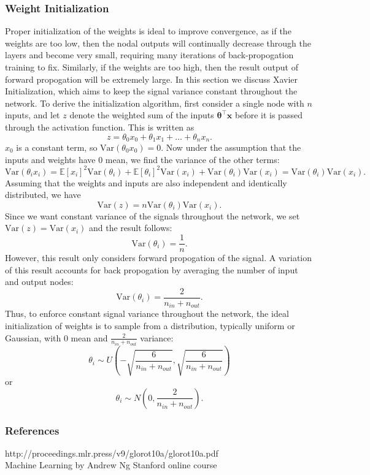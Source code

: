 \documentclass[a4paper,12pt]{article}
\newcommand{\E}{\mathbb{E}}
\newcommand{\Var}{\mathrm{Var}}
\numberwithin{equation}{section}
\begin{document}
\subsubsection{Weight Initialization}
Proper initialization of the weights is ideal to improve convergence, as if the weights are too low, then the nodal outputs will continually decrease through the layers and become very small, requiring many iterations of back-propogation training to fix. Similarly, if the weights are too high, then the result output of forward propogation will be extremely large. In this section we discuss Xavier Initialization, which aims to keep the signal variance constant throughout the network. To derive the initialization algorithm, first consider a single node with $n$ inputs, and let $z$ denote the weighted sum of the inputs $\bm{\theta}^\top\textbf{x}$ before it is passed through the activation function. This is written as
\[z=\theta_0x_0+\theta_1x_1+\dots+\theta_nx_n.\]
$x_0$ is a constant term, so $\Var(\theta_0x_0)=0$. Now under the assumption that the inputs and weights have 0 mean, we find the variance of the other terms:
\[\Var(\theta_ix_i)=\E[x_i]^2\Var(\theta_i)+\E[\theta_i]^2\Var(x_i)+\Var(\theta_i)\Var(x_i)=\Var(\theta_i)\Var(x_i).\]
Assuming that the weights and inputs are also independent and identically distributed, we have
\[\Var(z)=n\Var(\theta_i)\Var(x_i).\]
Since we want constant variance of the signals throughout the network, we set $\Var(z)=\Var(x_i)$ and the result follows:
\[\Var(\theta_i)=\frac1n.\]
However, this result only considers forward propogation of the signal. A variation of this result accounts for back propogation by averaging the number of input and output nodes:
\[\Var(\theta_i)=\frac{2}{n_{in}+n_{out}}.\]
Thus, to enforce constant signal variance throughout the network, the ideal initialization of weights is to sample from a distribution, typically uniform or Gaussian, with $0$ mean and $\frac{2}{n_{in}+n_{out}}$ variance:
\[\theta_i\sim U\left(-\sqrt{\frac{6}{n_{in}+n_{out}}},\sqrt{\frac{6}{n_{in}+n_{out}}}\right)\]
or
\[\theta_i\sim N\left(0,\frac{2}{n_{in}+n_{out}}\right).\]
\subsubsection{References}
http://proceedings.mlr.press/v9/glorot10a/glorot10a.pdf\\
Machine Learning by Andrew Ng Stanford online course\\
\newpage
\end{document}

